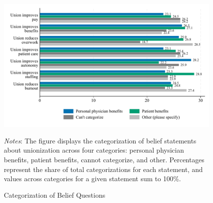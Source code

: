 \documentclass[11pt]{article}
\theoremstyle{definition}
\begin{document}
\begin{figure}[H]
	\centering
	\caption{Categorization of Belief Questions}
	\label{fig:cat_belief}
	\begin{adjustbox}{max width=\textwidth}
		\includegraphics{Pre-Survey/figures/cat_statements_outtype.pdf}
	\end{adjustbox}
	\parbox{.9\linewidth}{
		\vspace{.2cm}
		\scriptsize{\emph{Notes}: The figure displays the categorization of belief statements about unionization across four categories: personal physician benefits, patient benefits, cannot categorize, and other. Percentages represent the share of total categorizations for each statement, and values across categories for a given statement sum to 100\%.}
	}
\end{figure}
\end{document}
